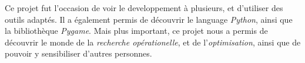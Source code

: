 Ce projet fut l'occasion de voir  %
le developpement à plusieurs, et d'utiliser
des outils adaptés.
Il a également permis de découvrir le language
\emph{Python}, ainsi que la bibliothèque \emph{Pygame}.
Mais plus important, ce projet nous a permis
de découvrir le monde de la \emph{recherche opérationelle},
et de l'\emph{optimisation}, ainsi que de pouvoir y sensibiliser
d'autres personnes.
